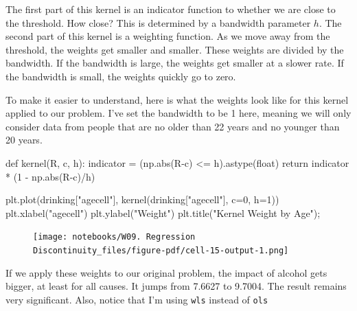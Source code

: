 \documentclass[
  letterpaper,
  DIV=11,
  numbers=noendperiod]{scrreprt}
\newenvironment{Shaded}{\begin{snugshade}}{\end{snugshade}}
\newcommand{\BuiltInTok}[1]{\textcolor[rgb]{0.00,0.23,0.31}{#1}}
\newcommand{\ControlFlowTok}[1]{\textcolor[rgb]{0.00,0.23,0.31}{#1}}
\newcommand{\DecValTok}[1]{\textcolor[rgb]{0.68,0.00,0.00}{#1}}
\newcommand{\KeywordTok}[1]{\textcolor[rgb]{0.00,0.23,0.31}{#1}}
\newcommand{\NormalTok}[1]{\textcolor[rgb]{0.00,0.23,0.31}{#1}}
\newcommand{\OperatorTok}[1]{\textcolor[rgb]{0.37,0.37,0.37}{#1}}
\newcommand{\StringTok}[1]{\textcolor[rgb]{0.13,0.47,0.30}{#1}}
\begin{document}
The first part of this kernel is an indicator function to whether we are
close to the threshold. How close? This is determined by a bandwidth
parameter \(h\). The second part of this kernel is a weighting function.
As we move away from the threshold, the weights get smaller and smaller.
These weights are divided by the bandwidth. If the bandwidth is large,
the weights get smaller at a slower rate. If the bandwidth is small, the
weights quickly go to zero.

To make it easier to understand, here is what the weights look like for
this kernel applied to our problem. I've set the bandwidth to be 1 here,
meaning we will only consider data from people that are no older than 22
years and no younger than 20 years.

\begin{Shaded}
\begin{Highlighting}[]
\KeywordTok{def}\NormalTok{ kernel(R, c, h):}
\NormalTok{    indicator }\OperatorTok{=}\NormalTok{ (np.}\BuiltInTok{abs}\NormalTok{(R}\OperatorTok{{-}}\NormalTok{c) }\OperatorTok{\textless{}=}\NormalTok{ h).astype(}\BuiltInTok{float}\NormalTok{)}
    \ControlFlowTok{return}\NormalTok{ indicator }\OperatorTok{*}\NormalTok{ (}\DecValTok{1} \OperatorTok{{-}}\NormalTok{ np.}\BuiltInTok{abs}\NormalTok{(R}\OperatorTok{{-}}\NormalTok{c)}\OperatorTok{/}\NormalTok{h)}
\end{Highlighting}
\end{Shaded}

\begin{Shaded}
\begin{Highlighting}[]
\NormalTok{plt.plot(drinking[}\StringTok{"agecell"}\NormalTok{], kernel(drinking[}\StringTok{"agecell"}\NormalTok{], c}\OperatorTok{=}\DecValTok{0}\NormalTok{, h}\OperatorTok{=}\DecValTok{1}\NormalTok{))}
\NormalTok{plt.xlabel(}\StringTok{"agecell"}\NormalTok{)}
\NormalTok{plt.ylabel(}\StringTok{"Weight"}\NormalTok{)}
\NormalTok{plt.title(}\StringTok{"Kernel Weight by Age"}\NormalTok{)}\OperatorTok{;}
\end{Highlighting}
\end{Shaded}

\begin{figure}[H]

{\centering \texttt{[image: notebooks/W09. Regression Discontinuity\_files/figure-pdf/cell-15-output-1.png]}

}

\end{figure}

If we apply these weights to our original problem, the impact of alcohol
gets bigger, at least for all causes. It jumps from 7.6627 to 9.7004.
The result remains very significant. Also, notice that I'm using
\texttt{wls} instead of \texttt{ols}
\end{document}
